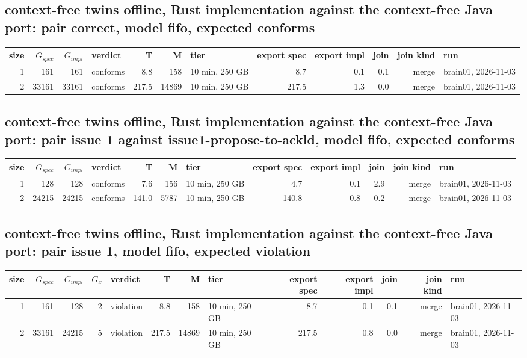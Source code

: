 \documentclass[10pt]{article}
\begin{document}
\subsection*{context-free twins offline, Rust implementation against the context-free Java port: pair \textsf{correct}, model fifo, expected conforms}
\begin{longtable}{@{}rrrlrrlrrrrl@{}}
\toprule
size & $G_{\mathit{spec}}$ & $G_{\mathit{impl}}$ & verdict & T & M & tier & export spec & export impl & join & join kind & run \\
\midrule
\endhead
\color{blue} 1 & 161 & 161 & conforms & 8.8 & 158 & 10 min, 250 GB & 8.7 & 0.1 & 0.1 & merge & brain01, 2026-11-03 \\
\color{blue} 2 & 33161 & 33161 & conforms & 217.5 & 14869 & 10 min, 250 GB & 217.5 & 1.3 & 0.0 & merge & brain01, 2026-11-03 \\
\bottomrule
\end{longtable}
\subsection*{context-free twins offline, Rust implementation against the context-free Java port: pair \textsf{issue 1} against \textsf{issue1-propose-to-ackld}, model fifo, expected conforms}
\begin{longtable}{@{}rrrlrrlrrrrl@{}}
\toprule
size & $G_{\mathit{spec}}$ & $G_{\mathit{impl}}$ & verdict & T & M & tier & export spec & export impl & join & join kind & run \\
\midrule
\endhead
\color{blue} 1 & 128 & 128 & conforms & 7.6 & 156 & 10 min, 250 GB & 4.7 & 0.1 & 2.9 & merge & brain01, 2026-11-03 \\
\color{blue} 2 & 24215 & 24215 & conforms & 141.0 & 5787 & 10 min, 250 GB & 140.8 & 0.8 & 0.2 & merge & brain01, 2026-11-03 \\
\bottomrule
\end{longtable}
\subsection*{context-free twins offline, Rust implementation against the context-free Java port: pair \textsf{issue 1}, model fifo, expected violation}
\begin{longtable}{@{}rrrrlrrlrrrrl@{}}
\toprule
size & $G_{\mathit{spec}}$ & $G_{\mathit{impl}}$ & $G_x$ & verdict & T & M & tier & export spec & export impl & join & join kind & run \\
\midrule
\endhead
\color{blue} 1 & 161 & 128 & 2 & violation & 8.8 & 158 & 10 min, 250 GB & 8.7 & 0.1 & 0.1 & merge & brain01, 2026-11-03 \\
\color{blue} 2 & 33161 & 24215 & 5 & violation & 217.5 & 14869 & 10 min, 250 GB & 217.5 & 0.8 & 0.0 & merge & brain01, 2026-11-03 \\
\bottomrule
\end{longtable}
\end{document}
